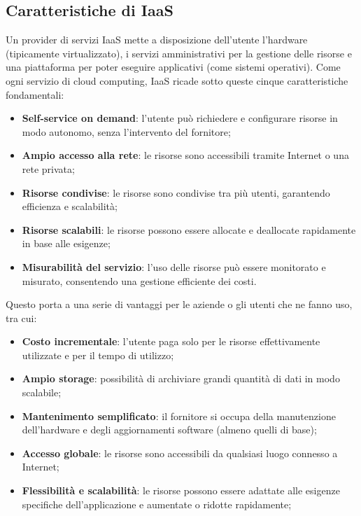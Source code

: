 \documentclass[12pt,a4paper,openright,twoside]{book}
\begin{document}
\subsection{Caratteristiche di IaaS}
Un provider di servizi \ac{IaaS} mette a disposizione dell'utente l'hardware (tipicamente virtualizzato), i servizi amministrativi per la gestione delle risorse e una piattaforma per poter eseguire applicativi (come sistemi operativi).
Come ogni servizio di cloud computing, \ac{IaaS} ricade sotto queste cinque caratteristiche fondamentali\cite{bhardwaj2010cloud}:
\begin{itemize}
    \item \textbf{Self-service on demand}: l'utente può richiedere e configurare risorse in modo autonomo, senza l'intervento del fornitore;
    \item \textbf{Ampio accesso alla rete}: le risorse sono accessibili tramite Internet o una rete privata;
    \item \textbf{Risorse condivise}: le risorse sono condivise tra più utenti, garantendo efficienza e scalabilità;
    \item \textbf{Risorse scalabili}: le risorse possono essere allocate e deallocate rapidamente in base alle esigenze;
    \item \textbf{Misurabilità del servizio}: l'uso delle risorse può essere monitorato e misurato, consentendo una gestione efficiente dei costi.
\end{itemize}
Questo porta a una serie di vantaggi per le aziende o gli utenti che ne fanno uso, tra cui\cite{bhardwaj2010cloud}:
\begin{itemize}
    \item \textbf{Costo incrementale}: l'utente paga solo per le risorse effettivamente utilizzate e per il tempo di utilizzo;
    \item \textbf{Ampio storage}: possibilità di archiviare grandi quantità di dati in modo scalabile;
    \item \textbf{Mantenimento semplificato}: il fornitore si occupa della manutenzione dell'hardware e degli aggiornamenti software (almeno quelli di base);
    \item \textbf{Accesso globale}: le risorse sono accessibili da qualsiasi luogo connesso a Internet;
    \item \textbf{Flessibilità e scalabilità}: le risorse possono essere adattate alle esigenze specifiche dell'applicazione e aumentate o ridotte rapidamente;
\end{itemize}
\end{document}
